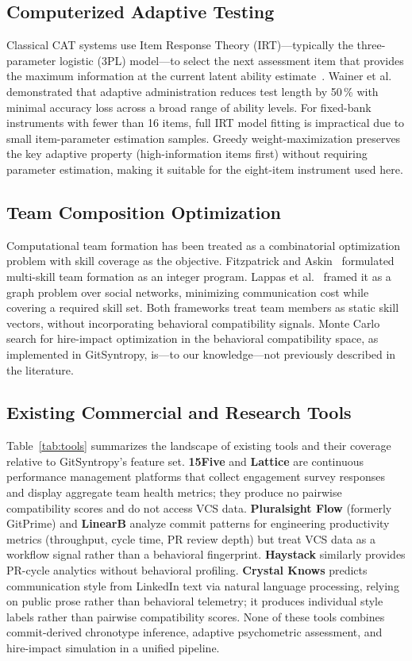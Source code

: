 \documentclass[conference]{IEEEtran}
\begin{document}
\subsection{Computerized Adaptive Testing}

Classical CAT systems use Item Response Theory (IRT)---typically the
three-parameter logistic (3PL) model---to select the next assessment
item that provides the maximum information at the current latent
ability estimate~\cite{vanderlinden2000}.  Wainer et al.~\cite{wainer2000}
demonstrated that adaptive administration reduces test length by
50\,\% with minimal accuracy loss across a broad range of ability
levels.  For fixed-bank instruments with fewer than 16 items, full
IRT model fitting is impractical due to small item-parameter
estimation samples.  Greedy weight-maximization preserves the key
adaptive property (high-information items first) without requiring
parameter estimation, making it suitable for the eight-item
instrument used here.

\subsection{Team Composition Optimization}

Computational team formation has been treated as a combinatorial
optimization problem with skill coverage as the objective.
Fitzpatrick and Askin~\cite{fitzpatrick2005} formulated multi-skill
team formation as an integer program.  Lappas et al.~\cite{lappas2009}
framed it as a graph problem over social networks, minimizing
communication cost while covering a required skill set.  Both
frameworks treat team members as static skill vectors, without
incorporating behavioral compatibility signals.  Monte Carlo
search for hire-impact optimization in the behavioral compatibility
space, as implemented in GitSyntropy, is---to our
knowledge---not previously described in the literature.

\subsection{Existing Commercial and Research Tools}

Table~\ref{tab:tools} summarizes the landscape of existing tools
and their coverage relative to GitSyntropy's feature set.
\textbf{15Five} and \textbf{Lattice} are continuous performance
management platforms that collect engagement survey responses and
display aggregate team health metrics; they produce no
pairwise compatibility scores and do not access VCS data.
\textbf{Pluralsight Flow} (formerly GitPrime) and \textbf{LinearB}
analyze commit patterns for engineering productivity metrics
(throughput, cycle time, PR review depth) but treat VCS data as
a workflow signal rather than a behavioral fingerprint.
\textbf{Haystack} similarly provides PR-cycle analytics without
behavioral profiling.  \textbf{Crystal Knows} predicts communication
style from LinkedIn text via natural language processing, relying
on public prose rather than behavioral telemetry; it produces
individual style labels rather than pairwise compatibility scores.
None of these tools combines commit-derived chronotype inference,
adaptive psychometric assessment, and hire-impact simulation in a
unified pipeline.
\end{document}
